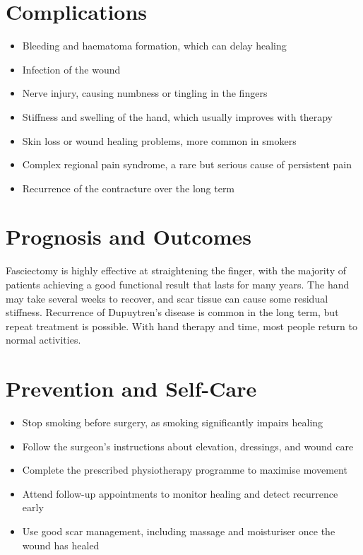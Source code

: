 \section*{Complications}
\begin{itemize}
    \item Bleeding and haematoma formation, which can delay healing
    \item Infection of the wound
    \item Nerve injury, causing numbness or tingling in the fingers
    \item Stiffness and swelling of the hand, which usually improves with therapy
    \item Skin loss or wound healing problems, more common in smokers
    \item Complex regional pain syndrome, a rare but serious cause of persistent pain
    \item Recurrence of the contracture over the long term
\end{itemize}

\section*{Prognosis and Outcomes}
Fasciectomy is highly effective at straightening the finger, with the majority of patients achieving a good functional result that lasts for many years. The hand may take several weeks to recover, and scar tissue can cause some residual stiffness. Recurrence of Dupuytren's disease is common in the long term, but repeat treatment is possible. With hand therapy and time, most people return to normal activities.

\section*{Prevention and Self-Care}
\begin{itemize}
    \item Stop smoking before surgery, as smoking significantly impairs healing
    \item Follow the surgeon's instructions about elevation, dressings, and wound care
    \item Complete the prescribed physiotherapy programme to maximise movement
    \item Attend follow-up appointments to monitor healing and detect recurrence early
    \item Use good scar management, including massage and moisturiser once the wound has healed
\end{itemize}

